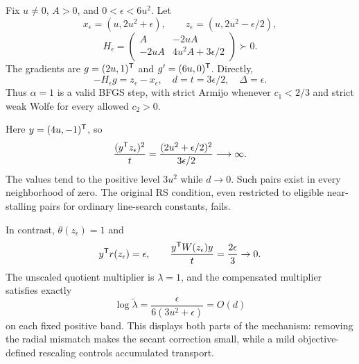 Fix $u\ne0$, $A>0$, and $0<\epsilon<6u^2$. Let
\[
 x_\epsilon=(u,2u^2+\epsilon),\qquad
 z_\epsilon=(u,2u^2-\epsilon/2),
\]
\[
 H_\epsilon=
 \begin{pmatrix}
 A&-2uA\\-2uA&4u^2A+3\epsilon/2
 \end{pmatrix}\succ0.
\]
The gradients are $g=(2u,1)^{\mathsf T}$ and $g'=(6u,0)^{\mathsf T}$. Directly,
\[
 -H_\epsilon g=z_\epsilon-x_\epsilon,
 \quad d=t=3\epsilon/2,\quad \Delta=\epsilon.
\]
Thus $\alpha=1$ is a valid BFGS step, with strict Armijo whenever $c_1<2/3$ and strict weak Wolfe for every allowed $c_2>0$.

Here $y=(4u,-1)^{\mathsf T}$, so
\[
 \frac{(y^{\mathsf T} z_\epsilon)^2}{t}
 =\frac{(2u^2+\epsilon/2)^2}{3\epsilon/2}\longrightarrow\infty.
\]
The values tend to the positive level $3u^2$ while $d\to0$. Such pairs exist in every neighborhood of zero. The original RS condition, even restricted to eligible near-stalling pairs for ordinary line-search constants, fails.

In contrast, $\theta(z_\epsilon)=1$ and
\[
 y^{\mathsf T} r(z_\epsilon)=\epsilon,\qquad
 \frac{y^{\mathsf T} W(z_\epsilon)y}{t}=\frac{2\epsilon}{3}\to0.
\]
The unscaled quotient multiplier is $\lambda=1$, and the compensated multiplier satisfies exactly
\[
 \log\widetilde\lambda
 =\frac{\epsilon}{6(3u^2+\epsilon)}=O(d)
\]
on each fixed positive band. This displays both parts of the mechanism: removing the radial mismatch makes the secant correction small, while a mild objective-defined rescaling controls accumulated transport.


\endgroup
